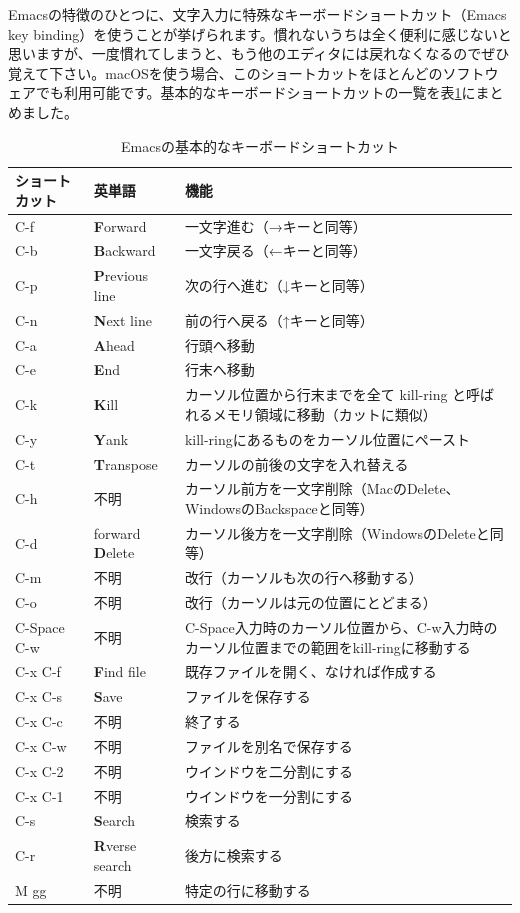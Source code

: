 Emacsの特徴のひとつに、文字入力に特殊なキーボードショートカット（Emacs key binding）を使うことが挙げられます。慣れないうちは全く便利に感じないと思いますが、一度慣れてしまうと、もう他のエディタには戻れなくなるのでぜひ覚えて下さい。macOSを使う場合、このショートカットをほとんどのソフトウェアでも利用可能です。基本的なキーボードショートカットの一覧を表\ref{tab_emacs}にまとめました。

\begin{table}
  \centering
  \caption{Emacsの基本的なキーボードショートカット}
  \label{tab_emacs}
  \begin{tabular}{llp{10cm}}
  \hline
ショートカット & 英単語 & 機能 \\ \hline\hline
C-f & {\bf F}orward & 一文字進む（→キーと同等） \\
C-b & {\bf B}ackward & 一文字戻る（←キーと同等） \\
C-p & {\bf P}revious line & 次の行へ進む（↓キーと同等） \\
C-n & {\bf N}ext line & 前の行へ戻る（↑キーと同等） \\
C-a & {\bf A}head & 行頭へ移動 \\
C-e & {\bf E}nd & 行末へ移動 \\
C-k & {\bf K}ill & カーソル位置から行末までを全て kill-ring と呼ばれるメモリ領域に移動（カットに類似） \\
C-y & {\bf Y}ank & kill-ringにあるものをカーソル位置にペースト \\
C-t & {\bf T}ranspose & カーソルの前後の文字を入れ替える \\
C-h & 不明 & カーソル前方を一文字削除（MacのDelete、WindowsのBackspaceと同等） \\
C-d & forward {\bf D}elete & カーソル後方を一文字削除（WindowsのDeleteと同等） \\
C-m & 不明 & 改行（カーソルも次の行へ移動する） \\
C-o & 不明 & 改行（カーソルは元の位置にとどまる） \\
C-Space C-w & 不明 & C-Space入力時のカーソル位置から、C-w入力時のカーソル位置までの範囲をkill-ringに移動する \\ \hline
C-x C-f & {\bf F}ind file & 既存ファイルを開く、なければ作成する \\
C-x C-s & {\bf S}ave & ファイルを保存する \\
C-x C-c & 不明 & 終了する \\
C-x C-w & 不明 & ファイルを別名で保存する \\
C-x C-2 & 不明 & ウインドウを二分割にする \\
C-x C-1 & 不明 & ウインドウを一分割にする \\
C-s & {\bf S}earch & 検索する \\
C-r & {\bf R}verse search & 後方に検索する \\
M gg & 不明 & 特定の行に移動する\\\hline
  \end{tabular}
\end{table}

